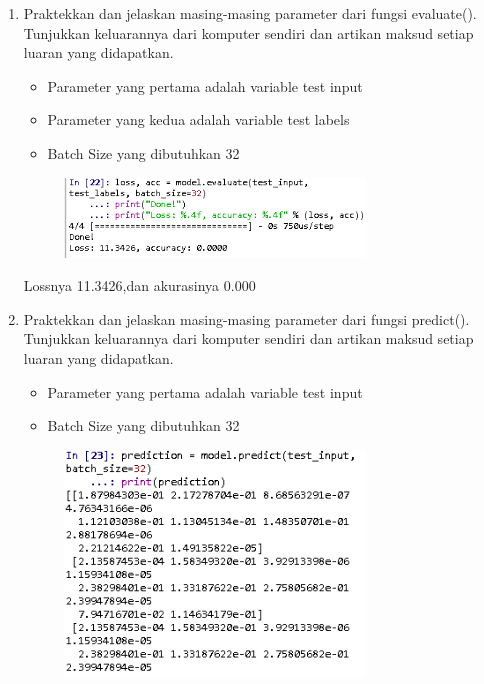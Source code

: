 \begin{enumerate}
\begin{figure}[H]
		\centering
	\end{figure}
	\item Praktekkan dan jelaskan masing-masing parameter dari fungsi evaluate(). Tunjukkan keluarannya dari komputer sendiri dan artikan maksud setiap luaran yang didapatkan.
	\hfill\break
	
	\begin{itemize}
		\item Parameter yang pertama adalah variable test input
		\item Parameter yang kedua adalah variable test labels
		\item Batch Size yang dibutuhkan 32
	\end{itemize}
	\hfill\break
	\begin{figure}[H]
		\includegraphics[width=8cm]{figures/1174079/6/10.PNG}
		\centering
	\end{figure}
	Lossnya 11.3426,dan akurasinya 0.000
	\item Praktekkan dan jelaskan masing-masing parameter dari fungsi predict(). Tunjukkan keluarannya dari komputer sendiri dan artikan maksud setiap luaran yang didapatkan.
	\hfill\break
	
	\begin{itemize}
		\item Parameter yang pertama adalah variable test input
		\item Batch Size yang dibutuhkan 32
	\end{itemize}
	\hfill\break
	\begin{figure}[H]
		\includegraphics[width=8cm]{figures/1174079/6/11.PNG}
		\centering
	\end{figure}
\end{enumerate}


